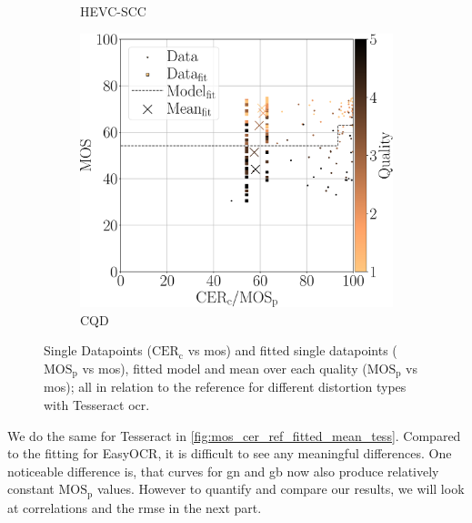\begin{figure}[h!]
\begin{subfigure}[b]{0.3\textwidth}
        \caption{HEVC-SCC}
        \label{fig:mos_cer_ref_fitted_mean_tess_HEVC-SCC}
    \end{subfigure}
    \hfill
    \begin{subfigure}[b]{0.3\textwidth}
        \includegraphics[width=\textwidth]{../../images/analyze/mos_cer_ref_fitted_mean_tess_CQD.pdf}
        \caption{CQD}
        \label{fig:mos_cer_ref_fitted_mean_tess_CQD}
    \end{subfigure}
    \caption{Single Datapoints ($\text{CER}_{\text{c}}$ vs \gls{mos}) and fitted single datapoints ($\text{MOS}_{\text{p}}$ vs \gls{mos}), fitted model and mean over each quality ($\text{MOS}_{\text{p}}$ vs \gls{mos}); all in relation to the reference for different distortion types with Tesseract \gls{ocr}.}
\label{fig:mos_cer_ref_fitted_mean_tess}
\end{figure}

We do the same for Tesseract in \autoref{fig:mos_cer_ref_fitted_mean_tess}.
Compared to the fitting for EasyOCR, it is difficult to see any meaningful differences.
One noticeable difference is, that curves for \gls{gn} and \gls{gb} now also produce relatively constant $\text{MOS}_{\text{p}}$ values.
However to quantify and compare our results, we will look at correlations and the \gls{rmse} in the next part.

